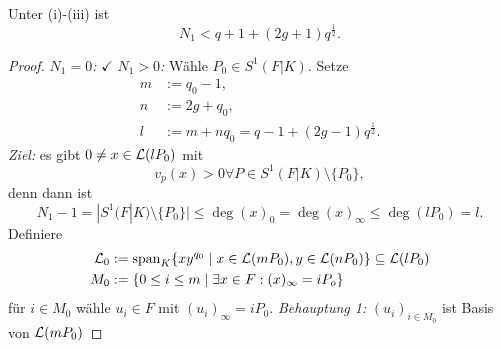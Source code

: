 \begin{satz}
    Unter (i)-(iii) ist 
    $$ N_1 < q +1 + (2g +1)q^\frac{1}{2}. $$
\end{satz}
\begin{proof}
    \emph{$N_1=0$:} $\checkmark$\nl
    \emph{$N_1 > 0$:} Wähle $P_0 \in S^1(F|K)$. Setze 
    \begin{align*}
        m&:= q_0 -1,\\
        n&:= 2g + q_0,\\
        l&:=m+nq_0=q-1 + (2g-1)q^\frac{1}{2}.
    \end{align*}
    \emph{Ziel:} es gibt $0 \ne x \in \mathcal{L}(lP_0)$ mit 
    $$v_p(x)>0 \forall P \in S^1(F|K)\setminus \{P_0\},$$
    denn dann ist
    $$ N_1 -1 = |S^1(F|K)\setminus \{P_0\}| \leq \deg(x)_0 = \deg (x)_\infty \leq \deg (lP_0) = l.$$
    Definiere
    \begin{align*}
        \mathcal{L}_0 &:= \operatorname{span}_K \{xy^{q_0} \mid x \in \mathcal{L}(mP_0), y \in \mathcal{L}(nP_0)\} \subseteq \mathcal{L}(lP_0) \\
        M_0 &:= \{0 \leq i \leq m \mid \exists x \in F: (x)_\infty = i P_o\}
    \end{align*}
    für $i \in M_0$ wähle $u_i \in F$ mit $(u_i)_\infty = i P_0$.\nl\nl
    \emph{Behauptung 1:} $(u_i)_{i \in M_0}$ ist Basis von $\mathcal{L}(mP_0)$


\end{proof}
